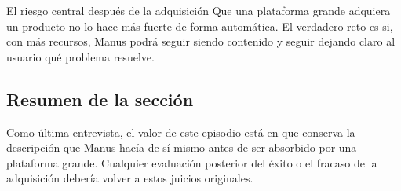 \begin{warningbox}{El riesgo central después de la adquisición}
Que una plataforma grande adquiera un producto no lo hace más fuerte de forma automática. El verdadero reto es si, con más recursos, Manus podrá seguir siendo contenido y seguir dejando claro al usuario qué problema resuelve.
\end{warningbox}

\subsection{Resumen de la sección}

Como última entrevista, el valor de este episodio está en que conserva la descripción que Manus hacía de sí mismo antes de ser absorbido por una plataforma grande. Cualquier evaluación posterior del éxito o el fracaso de la adquisición debería volver a estos juicios originales.
